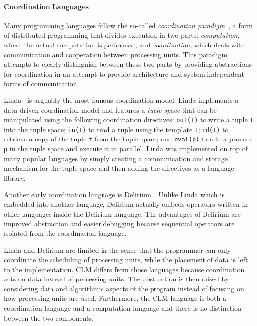 \paragraph{Coordination Languages}
Many programming languages follow the so-called \emph{coordination
paradigm}~\cite{Papadopoulos98coordinationmodels}, a form of distributed
programming that divides execution in two parts: \emph{computation}, where the actual
computation is performed, and \emph{coordination}, which deals with
communication and cooperation between processing units. This paradigm attempts
to clearly distinguish between these two parts by providing abstractions for
coordination in an attempt to provide architecture and system-independent forms
of communication.  

Linda~\cite{linda} is arguably the most famous coordination model. Linda
implements a data-driven coordination model and features a \emph{tuple space}
that can be manipulated using the following coordination directives:
\texttt{out(t)} to write a tuple \texttt{t} into the tuple space; \texttt{in(t)}
to read a tuple using the template \texttt{t}; \texttt{rd(t)} to retrieve a copy
of the tuple \texttt{t} from the tuple space; and \texttt{eval(p)} to add a
process \texttt{p} in the tuple space and execute it in parallel.  Linda was
implemented on top of many popular languages by simply creating a communication
and storage mechanism for the tuple space and then adding the directives as a
language library.

Another early coordination language is Delirium~\cite{Delirium}. Unlike Linda
which is embedded into another language, Delirium actually embeds operators
written in other languages inside the Delirium language.  The advantages of
Delirium are improved abstraction and easier debugging because sequential
operators are isolated from the coordination language.

Linda and Delirium are limited in the sense that the programmer can only
coordinate the scheduling of processing units, while the placement of data is
left to the implementation. CLM differs from those
languages because coordination acts on data instead of processing units.
The abstraction is then raised by considering data and algorithmic aspects of
the program instead of focusing on how processing units are used.
Furthermore, the CLM language is both a coordination language and a computation
language and there is no distinction between the two components.


